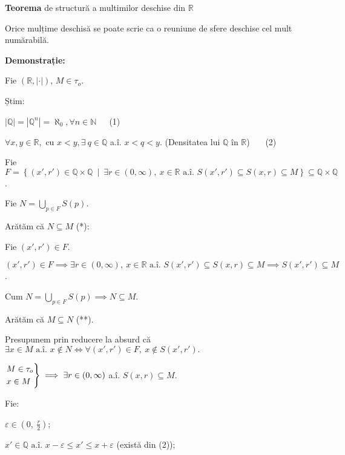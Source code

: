 \documentclass[11pt]{article}
\date{}
\title{}
\begin{document}
\textbf{Teorema} de structură a multimilor deschise din $\mathbb{R}$
\vspace{7pt}

Orice mulțime deschisă se poate scrie ca o reuniune de sfere deschise cel mult numărabilă.

\vspace{7pt}
\textbf{Demonstrație:}
\vspace{7pt}

Fie $(\mathbb{R}, |\cdot|)$, $M \in \tau_o $.

Știm:

$| \mathbb{Q} | = | \mathbb{Q}^n | =\aleph_0, \forall n \in \mathbb{N}$\ \ \ (1)

$\forall x, y \in \mathbb{R},$ cu $x < y, \exists\ q \in \mathbb{Q}$ a.î. $x < q < y.$ (Densitatea lui $\mathbb{Q}$ în $\mathbb{R}$) \ \ \ (2)

\vspace{7pt}


Fie $F = \left\{ (x', r') \in  \mathbb{Q} \times \mathbb{Q}\ \middle|\ \exists r \in (0, \infty),\ x \in \mathbb{R} \text{ a.î. }
S(x', r') \subseteq S(x, r) \subseteq M \right\} \subseteq \mathbb{Q} \times \mathbb{Q}$.

Fie $N = \bigcup\limits_{p \in F} S(p)$.

\vspace{7pt}
Arătăm că $N \subseteq M$ (*):

Fie $(x', r') \in F$.

$(x', r') \in F \implies \exists r \in (0, \infty),\ x \in \mathbb{R} \text{ a.î. } S(x', r') \subseteq S(x, r) \subseteq M \implies S(x', r') \subseteq M$.

Cum $N = \bigcup\limits_{p \in F} S(p) \implies N \subseteq M$.


\vspace{7pt}
Arătăm că $M \subseteq N$ (**).

Presupunem prin reducere la absurd că $\exists x \in M \text{ a.î. } x \notin N \iff  \forall (x', r') \in F,\ x \notin S(x', r').$

$\begin{rcases}
M \in \tau_o \\
x \in M
\end{rcases}
\implies \exists r \in (0, \infty)$ a.î. $S(x, r) \subseteq M$.

Fie:

$\varepsilon \in \left(0,\ \frac{r}{2}\right)$;

$x' \in \mathbb{Q}  \text{ a.î. } x - \varepsilon \le x' \le x + \varepsilon$ (există din (2));
\end{document}
